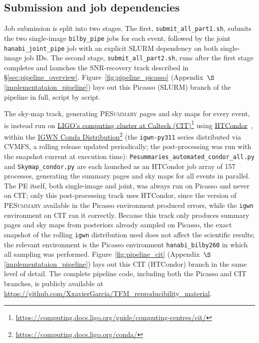 \subsection{Submission and job dependencies}

Job submission is split into two stages. The first, \texttt{submit\_all\_part1.sh}, submits the two single-image \texttt{bilby\_pipe} jobs for each event, followed by the joint \texttt{hanabi\_joint\_pipe} job with an explicit SLURM dependency on both single-image job IDs. The second stage, \texttt{submit\_all\_part2.sh}, runs after the first stage completes and launches the SNR-recovery track described in \S\ref{sec:pipeline_overview}. Figure~\ref{fig:pipeline_picasso} (Appendix~$\S$\ref{implementataion_pipeline}) lays out this Picasso (SLURM) branch of the pipeline in full, script by script.

The sky-map track, generating \textsc{PESummary} pages and sky maps for every event, is instead run on \href{https://computing.docs.ligo.org/guide/computing-centres/cit/}{LIGO's computing cluster at Caltech (CIT)}\footnote{\url{https://computing.docs.ligo.org/guide/computing-centres/cit/}} using \href{https://htcondor.readthedocs.io/en/latest/}{HTCondor}~\cite{HTCondor}, within the \href{https://computing.docs.ligo.org/conda/}{IGWN Conda Distribution}\footnote{\url{https://computing.docs.ligo.org/conda/}} (the \texttt{igwn-py311} series distributed via CVMFS, a rolling release updated periodically; the post-processing was run with the snapshot current at execution time): \texttt{Pesummaries\_\allowbreak automated\_\allowbreak condor\_\allowbreak all.py} and \texttt{Skymap\_\allowbreak condor.py} are each launched as an HTCondor job array of 157 processes, generating the summary pages and sky maps for all events in parallel. The PE itself, both single-image and joint, was always run on Picasso and never on CIT; only this post-processing track uses HTCondor, since the version of \textsc{PESummary} available in the Picasso environment produced errors, while the \texttt{igwn} environment on CIT ran it correctly. Because this track only produces summary pages and sky maps from posteriors already sampled on Picasso, the exact snapshot of the rolling \texttt{igwn} distribution used does not affect the scientific results; the relevant environment is the Picasso environment \texttt{hanabi\_\allowbreak bilby260} in which all sampling was performed. Figure~\ref{fig:pipeline_cit} (Appendix~$\S$\ref{implementataion_pipeline}) lays out this CIT (HTCondor) branch in the same level of detail. The complete pipeline code, including both the Picasso and CIT branches, is publicly available at \url{https://github.com/XxavierGarcia/TFM_reproducibility_material}.

